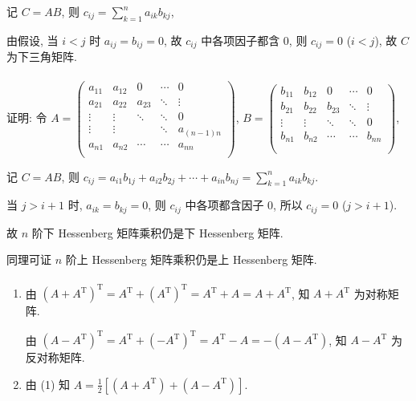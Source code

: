 		 记 $C = AB$, 则 $c_{ij} = \sum_{k=1}^{n} a_{ik} b_{kj}$,

		 由假设, 当 $i < j$ 时 $a_{ij} = b_{ij} = 0$, 故 $c_{ij}$ 中各项因子都含 $0$, 则 $c_{ij} = 0$ ($i < j$),
		 故 $C$ 为下三角矩阵.


	 \paragraph{} %
		 证明: 令 $A = \begin{pmatrix}
				 a_{11}  & a_{12}  & 0      & \cdots & 0          \\
				 a_{21}  & a_{22}  & a_{23} & \ddots & \vdots     \\
				 \vdots  & \vdots  & \ddots & \ddots & 0          \\
				 \vdots  & \vdots  &        & \ddots & a_{(n-1)n} \\
				 a_{n 1} & a_{n 2} & \cdots & \cdots & a_{nn}     \\
			 \end{pmatrix}$, $B = \begin{pmatrix}
				 b_{11}  & b_{12}  & 0      & \cdots & 0       \\
				 b_{21}  & b_{22}  & b_{23} & \ddots & \vdots  \\
				 \vdots  & \vdots  & \ddots & \ddots & 0       \\
				 b_{n 1} & b_{n 2} & \cdots & \cdots & b_{n n} \\
				         &         &        &        &         \\
			 \end{pmatrix}$,

		 记 $C = AB$, 则 $c_{ij} = a_{i1} b_{1j} + a_{i2} b_{2j} + \cdots + a_{in} b_{nj} = \sum_{k=1}^{n} a_{ik} b_{kj}$.

		 当 $j > i+1$ 时, $a_{ik} = b_{kj} = 0$, 则 $c_{ij}$ 中各项都含因子 $0$, 所以 $c_{ij} = 0$ ($j > i+1$).

		 故 $n$ 阶下 Hessenberg 矩阵乘积仍是下 Hessenberg 矩阵.

		 同理可证 $n$ 阶上 Hessenberg 矩阵乘积仍是上 Hessenberg 矩阵.


	 \paragraph{} %
		 \begin{enumerate}
			 \item %
			       由 $(A + A^{\mathrm{T}})^{\mathrm{T}} = A^{\mathrm{T}} + (A^{\mathrm{T}})^{\mathrm{T}} = A^{\mathrm{T}} + A = A + A^{\mathrm{T}}$,
			       知 $A + A^{\mathrm{T}}$ 为对称矩阵.

			       由 $(A - A^{\mathrm{T}})^{\mathrm{T}} = A^{\mathrm{T}} + (-A^{\mathrm{T}})^{\mathrm{T}} = A^{\mathrm{T}} - A = -(A - A^{\mathrm{T}})$,
			       知 $A - A^{\mathrm{T}}$ 为反对称矩阵.

			 \item %
			       由 (1) 知 $A = \frac{1}{2} \left[ (A + A^{\mathrm{T}}) + (A - A^{\mathrm{T}}) \right]$.
		 \end{enumerate}


